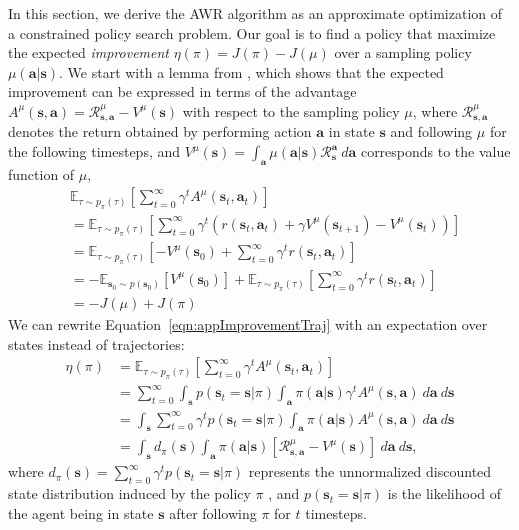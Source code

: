 \documentclass{article} \usepackage{iclr2020_conference,times}
\def\rva{{\mathbf{a}}}
\def\rvs{{\mathbf{s}}}
\begin{document}
In this section, we derive the AWR algorithm as an approximate optimization of a constrained policy search problem. Our goal is to find a policy that maximize the expected \emph{improvement} $\eta(\pi) = J(\pi) - J(\mu)$ over a sampling policy $\mu(\rva | \rvs)$. We start with a lemma from \citet{Kakade2002}, which shows that the expected improvement can be expressed in terms of the advantage $A^\mu(\rvs, \rva) = \mathcal{R}_{\rvs,\rva}^\mu - V^\mu(\rvs)$ with respect to the sampling policy $\mu$, where $\mathcal{R}_{\rvs,\rva}^\mu$ denotes the return obtained by performing action $\rva$ in state $\rvs$ and following $\mu$ for the following timesteps, and $V^\mu(\rvs) = \int_\rva \mu(\rva | \rvs) \mathcal{R}_\rvs^\rva \ d\rva$ corresponds to the value function of $\mu$,
\begin{align}
    & \mathbb{E}_{\tau \sim p_\pi(\tau)} \left[ \sum_{t=0}^\infty \gamma^t A^\mu(\rvs_t, \rva_t) \right] \\
    & = \mathbb{E}_{\tau \sim p_\pi(\tau)} \left[ \sum_{t=0}^\infty \gamma^t \left(r(\rvs_t, \rva_t) + \gamma V^\mu(\rvs_{t+1}) - V^\mu(\rvs_t) \right) \right] \\
    & = \mathbb{E}_{\tau \sim p_\pi(\tau)} \left[ -V^\mu(\rvs_0) + \sum_{t=0}^\infty \gamma^t r(\rvs_t, \rva_t) \right] \\
    & = -\mathbb{E}_{\rvs_0 \sim p(\rvs_0)} \left[V^\mu(\rvs_0)\right] + \mathbb{E}_{\tau \sim p_\pi(\tau)} \left[\sum_{t=0}^\infty \gamma^t r(\rvs_t, \rva_t) \right] \\
    & = -J(\mu) + J(\pi)
\end{align}
We can rewrite Equation~\ref{eqn:appImprovementTraj} with an expectation over states instead of trajectories:
\begin{align}
    \eta(\pi) & = \mathbb{E}_{\tau \sim p_\pi(\tau)} \left[ \sum_{t=0}^\infty \gamma^t A^\mu(\rvs_t, \rva_t) \right]\label{eqn:appImprovementTraj} \\
    & = \sum_{t=0}^\infty \int_\rvs p(\rvs_t = \rvs | \pi) \int_\rva \pi(\rva | \rvs) \gamma^t A^\mu(\rvs, \rva) \ d\rva \ d\rvs \\
    & = \int_\rvs \sum_{t=0}^\infty \gamma^t p(\rvs_t = \rvs | \pi) \int_\rva \pi(\rva | \rvs) A^\mu(\rvs, \rva) \ d\rva \ d\rvs \\
    & = \int_\rvs d_\pi(\rvs) \int_\rva \pi(\rva | \rvs) \left[\mathcal{R}_{\rvs,\rva}^\mu - V^\mu(\rvs)\right] \ d\rva \ d\rvs \label{eqn:AppImprovement},
\end{align}
where $d_\pi(\rvs) = \sum_{t=0}^\infty \gamma^t p(\rvs_t = \rvs | \pi)$ represents the unnormalized discounted state distribution induced by the policy $\pi$ \citep{Sutton1998}, and $p(\rvs_t = \rvs | \pi)$ is the likelihood of the agent being in state $\rvs$ after following $\pi$ for $t$ timesteps.
\end{document}
